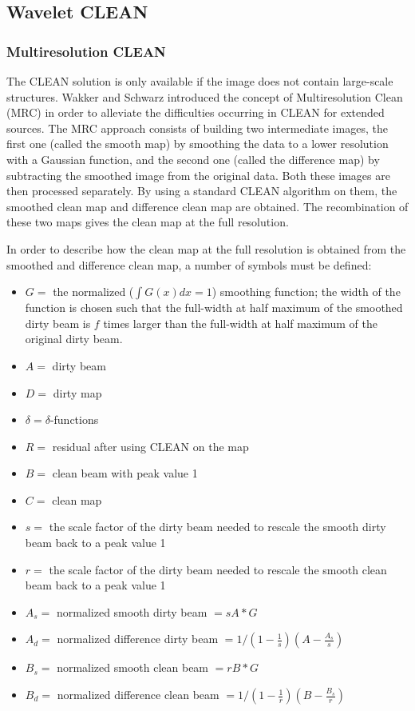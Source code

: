 \documentclass[11pt,a4paper]{article}
\begin{document}
\subsection{Wavelet CLEAN}
\subsubsection{Multiresolution CLEAN}

The CLEAN solution is only available if the image does not contain
large-scale structures.  Wakker and Schwarz \cite{rest:wakker88}
introduced the concept of Multiresolution Clean
(MRC) in order to alleviate the difficulties occurring
in CLEAN for extended sources.  The MRC approach
consists of building two intermediate images, the first one (called
the smooth map) by smoothing the data to a lower resolution with a
Gaussian function, and the second one (called the difference map)
by subtracting the smoothed image from the original data.  Both
these images are then processed separately.  By using a standard
CLEAN algorithm on them, the smoothed clean map and difference clean map are
obtained.  The recombination of these two maps gives the clean map
at the full resolution.

In order to describe how the clean map at the full resolution is
obtained from the smoothed and difference clean map, a number of symbols
must be defined:
\begin{itemize}
\item $G = $ the normalized  ($\int G(x)dx = 1$) smoothing function; the width
of the function is chosen such that the 
full-width at half maximum of the smoothed dirty beam is $f$
times larger than the full-width at half maximum of the original dirty beam.
\item $A = $ dirty beam
\item $D = $ dirty map
\item $\delta = \delta$-functions
\item $R = $ residual after using CLEAN on the map
\item $B = $ clean beam with peak value 1
\item $C = $ clean map 
\item $s = $ the scale factor of the dirty beam needed to rescale the smooth  dirty beam back to a peak value 1
\item $r = $ the scale factor of the dirty beam needed to rescale the smooth clean beam back to a peak value 1 
\item $A_s = $ normalized smooth dirty beam  $= s A * G$
\item $A_d = $ normalized difference dirty beam 
$= 1/(1-\frac{1}{s})(A-\frac{A_s}{s})$
\item $B_s = $ normalized smooth clean beam $= r B * G$
\item $B_d = $ normalized difference clean beam  
$= 1/(1-\frac{1}{r})(B-\frac{B_s}{r})$
\end{itemize}
\end{document}
